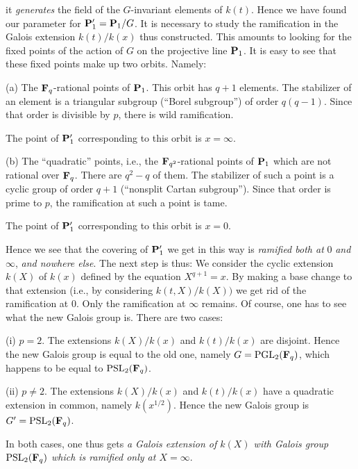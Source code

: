 it {\it generates\/} the field of the $G$-invariant elements
of $k(t)$.
Hence we have found our parameter for 
$\bold{P}'_1=\bold{P}_1/G$.
It is necessary to study the ramification in the Galois 
extension
$k(t)/k(x)$ thus constructed. This amounts to looking for the
fixed
points of the action of $G$ on the projective line 
$\bold{P}_1$. It is easy
to see that these fixed points make up two orbits. Namely:
\par
(a) The $\bold{F}_q$-rational points of $\bold{P}_1$. This 
orbit has $q+1$
elements. The stabilizer of an element is a triangular 
subgroup (``Borel
subgroup'') of order $q(q-1)$. Since that order is divisible 
by $p$, there
is wild ramification.
\par
The point of $\bold{P}^\prime_1$ corresponding to this orbit 
is
$x=\infty$.
\par
(b) The ``quadratic'' points, i.e., the 
$\bold{F}_{q^2}$-rational points of
$\bold{P}_1$ which are not rational over $\bold{F}_q$. There 
are $q^2-q$
of them. The stabilizer of such a point is a cyclic group of 
order $q+1$
(``nonsplit Cartan subgroup''). Since that order is prime to 
$p$, the
ramification at such a point is tame.
\par
The point of $\bold{P}^\prime_1$ corresponding to this orbit 
is
$x=0$.
\par
Hence we see that the covering of $\bold{P}^\prime_1$ we get 
in this way is
{\it ramified both at\/} $0$ {\it and\/} $\infty$, {\it and 
nowhere else\/}.
The next step is thus:
We consider the cyclic extension $k(X)$ of $k(x)$ defined by 
the
equation $X^{q+1}=x$. By making a base change to that 
extension
(i.e., by considering $k(t,X)/k(X))$ we get rid of the 
ramification
at $0$. Only the ramification at $\infty$ remains. Of course, 
one has
to see what the new Galois group is. There are two cases:
\par
(i) $p=2$. The extensions $k(X)/k(x)$
and $k(t)/k(x)$ are disjoint. Hence the new
Galois group is equal to the old one, namely
$G=\operatorname{PGL}_2(\bold{F}_q)$, which
happens to be equal to $\operatorname{PSL}_2
(\bold{F}_q)$.
\par
(ii) $p\ne2$. The extensions $k(X)/k(x)$ and
$k(t)/k(x)$ have a quadratic extension in common,
namely $k(x^{1/2})$. Hence the new Galois group
is $G'=\operatorname{PSL}_2(\bold{F}_q)$.
\par
In both cases, one thus gets {\it a Galois extension of
$k(X)$ with Galois group $\operatorname{PSL}_2(\bold{F}_q)$
which is ramified only at $X=\infty$}.
